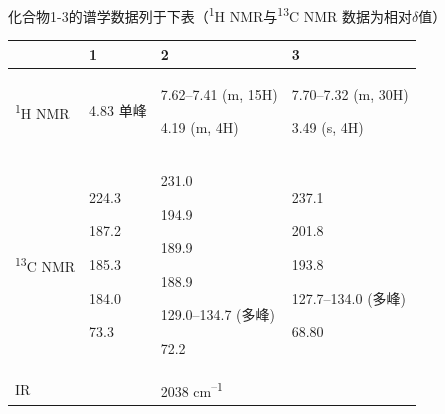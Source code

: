 化合物1-3的谱学数据列于下表（\textsuperscript{1}H
NMR与\textsuperscript{13}C NMR 数据为相对$\delta$值）

\begin{longtable}[]{@{}llll@{}}
	\toprule
	& \textbf{1} & \textbf{2} & \textbf{3}\tabularnewline
	\midrule
	\endhead
	\begin{minipage}[t]{0.22\columnwidth}\raggedright
		\textsuperscript{1}H NMR\strut
	\end{minipage} & \begin{minipage}[t]{0.22\columnwidth}\raggedright
		4.83 单峰\strut
	\end{minipage} & \begin{minipage}[t]{0.22\columnwidth}\raggedright
		7.62--7.41 (m, 15H)
		
		4.19 (m, 4H)\strut
	\end{minipage} & \begin{minipage}[t]{0.22\columnwidth}\raggedright
		7.70--7.32 (m, 30H)
		
		3.49 (s, 4H)\strut
	\end{minipage}\tabularnewline\midrule
	\begin{minipage}[t]{0.22\columnwidth}\raggedright
		\textsuperscript{13}C NMR\strut
	\end{minipage} & \begin{minipage}[t]{0.22\columnwidth}\raggedright
		224.3
		
		187.2
		
		185.3
		
		184.0
		
		73.3\strut
	\end{minipage} & \begin{minipage}[t]{0.22\columnwidth}\raggedright
		231.0
		
		194.9
		
		189.9
		
		188.9
		
		129.0--134.7 (多峰)
		
		72.2\strut
	\end{minipage} & \begin{minipage}[t]{0.22\columnwidth}\raggedright
		237.1
		
		201.8
		
		193.8
		
		127.7--134.0 (多峰)
		
		68.80\strut
	\end{minipage}\tabularnewline\midrule
	\begin{minipage}[t]{0.22\columnwidth}\raggedright
		IR\strut
	\end{minipage} & \begin{minipage}[t]{0.22\columnwidth}\raggedright
		\strut
	\end{minipage} & \begin{minipage}[t]{0.22\columnwidth}\raggedright
		2038 cm\textsuperscript{--1}
		

\end{minipage}
\end{longtable}
